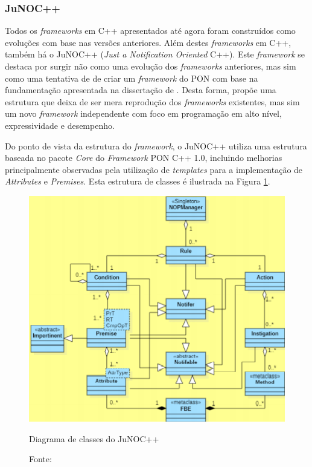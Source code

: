 \subsubsection{JuNOC++}

Todos os \textit{frameworks} em C++ apresentados até agora foram construídos
como evoluções com base nas versões anteriores. Além destes \textit{frameworks}
em C++, também há o JuNOC++ (\textit{Just a Notification Oriented} C++). Este
\textit{framework} se destaca por surgir não como uma evolução dos
\textit{frameworks} anteriores, mas sim como uma tentativa de
 de criar um \textit{framework} do PON com base na
fundamentação apresentada na dissertação de .
Desta forma,  propõe uma estrutura que deixa de ser
mera reprodução dos \textit{frameworks} existentes, mas sim um novo
\textit{framework} independente com foco em programação em alto nível,
expressividade e desempenho.

Do ponto de vista da estrutura do \textit{framework}, o JuNOC++ utiliza uma
estrutura baseada no pacote \textit{Core} do \textit{Framework} PON C++ 1.0,
incluindo melhorias principalmente observadas pela utilização de
\textit{templates} para a implementação de \textit{Attributes} e
\textit{Premises}. Esta estrutura de classes é ilustrada na Figura
\ref{fig:class_junoc}.

\begin{figure}[!htb]
  \centering
  \includegraphics[width=.7\textwidth]{../figures/junoc_class.png}
  \caption{Diagrama de classes do JuNOC++}
  \caption*{Fonte: }
  \label{fig:class_junoc}
\end{figure}

